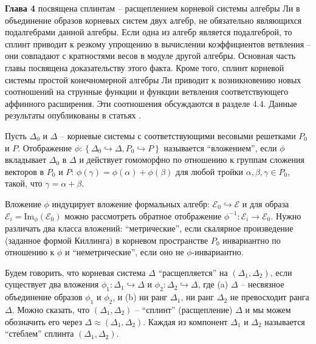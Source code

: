 \documentclass[14pt,autoref,href,facsimile
]{disser}
\begin{document}
\vspace{-0.3cm}
\textbf{Глава 4} посвящена сплинтам -- расщеплением корневой системы алгебры Ли в объединение образов корневых систем двух алгебр, не обязательно являющихся подалгебрами данной алгебры. Если одна из алгебр является подалгеброй, то сплинт приводит к резкому упрощению в вычислении коэффициентов ветвления -- они совпадают с кратностями весов в модуле другой алгебры. Основная часть главы посвящена доказательству этого факта. Кроме того, сплинт корневой системы простой конечномерной алгебры Ли приводит к возникновению новых соотношений на струнные функции и функции ветвления соответствующего аффинного расширения. Эти соотношения обсуждаются в разделе 4.4.
Данные результаты опубликованы в статьях .

\vspace{-0.3cm}
\begin{definition}
Пусть $\Delta _{0}$ и $\Delta$ -- корневые системы с соответствующими весовыми решетками $P_{0}$ и $P$. Отображение $\phi :\left\{
\Delta _{0}\hookrightarrow \Delta , 
P_{0}\hookrightarrow P
\right\}
$ называется ``вложением'', если  $\phi$ вкладывает $\Delta _{0}$ в $\Delta $ и действует гомоморфно по отношению к группам сложения векторов в $P_{0}$ и $P$:
$
\phi (\gamma )=\phi (\alpha )+\phi (\beta )
$
для любой тройки $\alpha ,\beta ,\gamma \in P_{0}$, такой, что $\gamma =\alpha+\beta $.
\end{definition}
\vspace{-0.5cm}
Вложение $\phi$ индуцирует вложение формальных алгебр: ${\mathcal{E}}_0\hookrightarrow \mathcal{E}$ и для образа ${\mathcal{E}}_i=\mathrm{Im}_{\phi}\left( {\mathcal{E}}_0\right)$ можно рассмотреть обратное отображение $\phi^{-1}:{\mathcal{E}}_i \longrightarrow {\mathcal{E}}_0$. Нужно различать два класса вложений: ``метрические'', если скалярное произведение (заданное формой Киллинга) в корневом пространстве $P_0$ инвариантно по отношению к  $\phi$ и ``неметрические'', если оно не  $\phi$-инвариантно. 

Будем говорить, что корневая система $\Delta$ ``расщепляется'' на  $(\Delta _{1},\Delta _{2})$, если существует два вложения  $\phi _{1}:\Delta _{1}\hookrightarrow \Delta $ и $\phi _{2}:\Delta _{2}\hookrightarrow \Delta $, где (a) $\Delta $ -- несвязное объединение образов $\phi _{1}$ и $\phi _{2}$, и (b) ни ранг  $\Delta _{1}$, ни ранг  $\Delta _{2}$ не превосходит ранга $\Delta $. Можно сказать, что  $(\Delta_1,\Delta_2)$  -- ``сплинт'' (расщепление)  $\Delta$ и мы можем обозначить его через $\Delta \approx (\Delta_1,\Delta_2)$. Каждая из компонент  $\Delta_1$ и $\Delta_2$ называется ``стеблем'' сплинта $(\Delta_1,\Delta_2)$.
\end{document}

